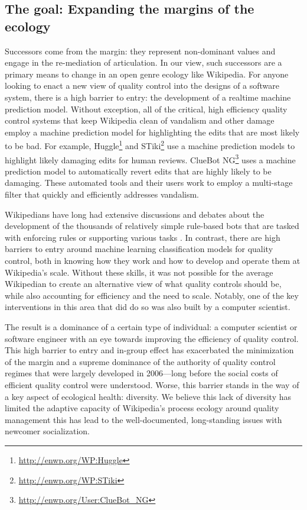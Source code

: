 \subsection{The goal: Expanding the margins of the ecology}
Successors come from the margin: they represent non-dominant values and engage in the re-mediation of articulation\cite{mugar2017preserving}.  In our view, such successors are a primary means to change in an open genre ecology like Wikipedia.  For anyone looking to enact a new view of quality control into the designs of a software system, there is a high barrier to entry: the development of a realtime machine prediction model.  Without exception, all of the critical, high efficiency quality control systems that keep Wikipedia clean of vandalism and other damage employ a machine prediction model for highlighting the edits that are most likely to be bad. For example, Huggle\footnote{\url{http://enwp.org/WP:Huggle}} and STiki\footnote{\url{http://enwp.org/WP:STiki}} use a machine prediction models to highlight likely damaging edits for human reviews.  ClueBot NG\footnote{\url{http://enwp.org/User:ClueBot_NG}} uses a machine prediction model to automatically revert edits that are highly likely to be damaging.  These automated tools and their users work to employ a multi-stage filter that quickly and efficiently addresses vandalism\cite{geiger2013levee}.

Wikipedians have long had extensive discussions and debates about the development of the thousands of relatively simple rule-based bots that are tasked with enforcing rules or supporting various tasks \cite{geiger2011lives}. In contrast, there are high barriers to entry around machine learning classification models for quality control, both in knowing how they work and how to develop and operate them at Wikipedia's scale.  Without these skills, it was not possible for the average Wikipedian to create an alternative view of what quality controls should be, while also accounting for efficiency and the need to scale.  Notably, one of the key interventions in this area that did do so was also built by a computer scientist\cite{halfaker2014snuggle}.

The result is a dominance of a certain type of individual: a computer scientist or software engineer with an eye towards improving the efficiency of quality control.  This high barrier to entry and in-group effect has exacerbated the minimization of the margin and a supreme dominance of the authority of quality control regimes that were largely developed in 2006---long before the social costs of efficient quality control were understood.  Worse, this barrier stands in the way of a key aspect of ecological health: diversity.  We believe this lack of diversity has limited the adaptive capacity of Wikipedia's process ecology around quality management this has lead to the well-documented, long-standing issues with newcomer socialization\cite{halfaker2013rise}.

